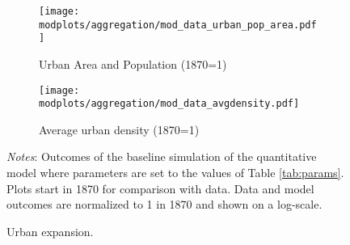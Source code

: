 \documentclass[./20250130-paper.tex]{subfiles}
\begin{document}
		
		

\begin{figure}[hpt]
	\begin{adjustbox}{center}	
		\begin{subfigure}{\ptwo\textwidth}
			\texttt{[image: \\modplots/aggregation/mod\_data\_urban\_pop\_area.pdf]}
			\caption{Urban Area and Population (1870=1)\label{fig:model-citysize}}
		\end{subfigure}
		\hspace{0.1cm}
		\begin{subfigure}{\ptwo\textwidth}
			\texttt{[image: \\modplots/aggregation/mod\_data\_avgdensity.pdf]}
			\caption{Average urban density (1870=1)\label{fig:model-density}}
		\end{subfigure}	
	\end{adjustbox}	
	\caption{Urban expansion.\label{fig:model-urbanexp}}
	{\footnotesize \textit{Notes}: Outcomes of the baseline simulation of the quantitative model where parameters are set to the values of Table \ref{tab:params}. Plots start in 1870 for comparison with data. Data and model outcomes are normalized to 1 in 1870 and shown on a log-scale.}	
\end{figure}
\end{document}
